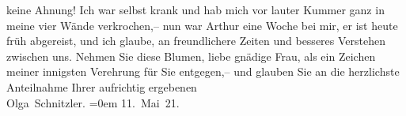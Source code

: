 \begin{ledgroupsized}[t]{13cm}
               keine Ahnung! Ich war selbst krank und hab mich vor lauter Kummer ganz in meine vier
               Wände verkrochen,– nun war Arthur eine Woche
               bei mir, er ist heute früh abgereist, und ich glaube, an freundlichere Zeiten und
               besseres Verstehen zwischen uns.\pend
           \pstart
           Nehmen Sie diese Blumen, liebe gnädige Frau, als ein Zeichen meiner innigsten
               Verehrung für Sie entgegen,– und glauben Sie an die herzlichste Anteilnahme{\pb}\pend
           \pstart
           Ihrer aufrichtig ergebenen{\\[\baselineskip]}\spacefill\mbox{Olga Schnitzler.}\pend
           \leftskip=0em{}\pstart
           \noindent{}11. Mai 21. \pend
           
         
         \endnumbering{}\end{ledgroupsized}  \newcommand{\dateiname}{L02367}\newcommand{\titel}{Olga Schnitzler an Anna Bahr-Mildenburg, 11. 5. 1921}\newcommand{\editorInnen}{ Martin Anton Müller und Gerd-Hermann Susen}
      